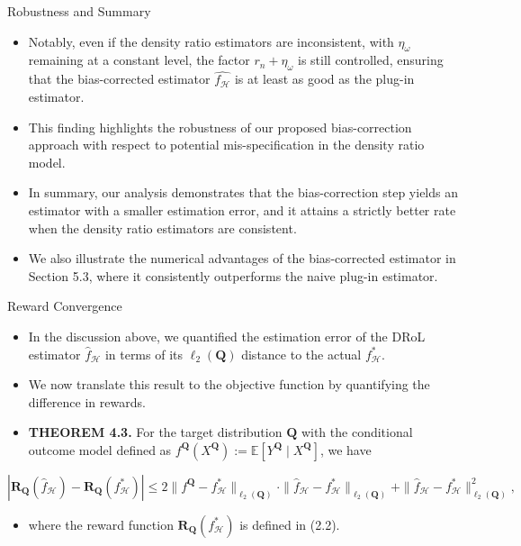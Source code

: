 \documentclass{beamer}
\begin{document}
\begin{frame}{Robustness and Summary}
    \begin{itemize}
        \item Notably, even if the density ratio estimators are inconsistent, with $\eta_{\omega}$ remaining at a constant level, the factor $r_{n} + \eta_{\omega}$ is still controlled, ensuring that the bias-corrected estimator $\widehat{f_{\mathcal{H}}}$ is at least as good as the plug-in estimator.
        \item This finding highlights the robustness of our proposed bias-correction approach with respect to potential mis-specification in the density ratio model.
        \item In summary, our analysis demonstrates that the bias-correction step yields an estimator with a smaller estimation error, and it attains a strictly better rate when the density ratio estimators are consistent.
        \item We also illustrate the numerical advantages of the bias-corrected estimator in Section 5.3, where it consistently outperforms the naive plug-in estimator.
    \end{itemize}
\end{frame}

\begin{frame}{Reward Convergence}
    \begin{itemize}
        \item In the discussion above, we quantified the estimation error of the DRoL estimator $\widehat{f}_{\mathcal{H}}$ in terms of its $\ell_{2}(\mathbf{Q})$ distance to the actual $f_{\mathcal{H}}^{*}$.
        \item We now translate this result to the objective function by quantifying the difference in rewards.
        \item \textbf{THEOREM 4.3.} For the target distribution $\mathbf{Q}$ with the conditional outcome model defined as $f^{\mathbf{Q}}(X^{\mathbf{Q}}) := \mathbb{E}[Y^{\mathbf{Q}} \mid X^{\mathbf{Q}}]$, we have
    \end{itemize}
    \begin{equation*}
        \left| \mathbf{R} _{\mathbf{Q}} (\widehat{f} _{\mathcal{H}}) - \mathbf{R} _{\mathbf{Q}} (f _{\mathcal{H}} ^{*}) \right| \leq 2 \| f ^{\mathbf{Q}} - f _{\mathcal{H}} ^{*} \| _{\ell_{2} (\mathbf{Q})} \cdot \| \widehat{f} _{\mathcal{H}} - f _{\mathcal{H}} ^{*} \| _{\ell_{2} (\mathbf{Q})} + \| \widehat{f} _{\mathcal{H}} - f _{\mathcal{H}} ^{*} \| _{\ell_{2} (\mathbf{Q})} ^{2},
    \end{equation*}
    \begin{itemize}
        \item where the reward function $\mathbf{R}_{\mathbf{Q}}(f_{\mathcal{H}}^{*})$ is defined in (2.2).
    \end{itemize}
\end{frame}
\end{document}
